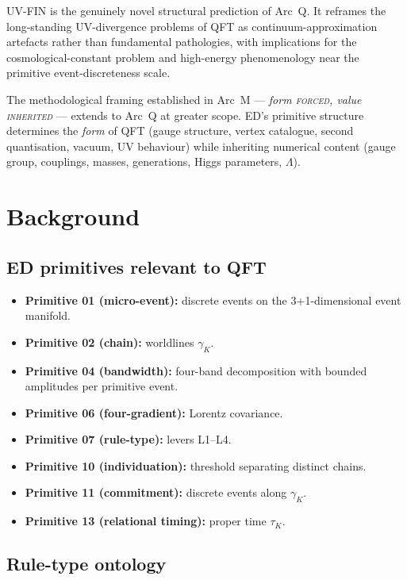 \documentclass[11pt,a4paper]{article}
\begin{document}
UV-FIN is the genuinely novel structural prediction of Arc~Q. It reframes the long-standing UV-divergence problems of QFT as continuum-approximation artefacts rather than fundamental pathologies, with implications for the cosmological-constant problem and high-energy phenomenology near the primitive event-discreteness scale.

The methodological framing established in Arc~M --- \emph{form \textsc{forced}, value \textsc{inherited}} --- extends to Arc~Q at greater scope. ED's primitive structure determines the \emph{form} of QFT (gauge structure, vertex catalogue, second quantisation, vacuum, UV behaviour) while inheriting numerical content (gauge group, couplings, masses, generations, Higgs parameters, $\Lambda$).

\section{Background}

\subsection{ED primitives relevant to QFT}

\begin{itemize}
  \item \textbf{Primitive 01 (micro-event):} discrete events on the 3+1-dimensional event manifold.
  \item \textbf{Primitive 02 (chain):} worldlines $\gamma_K$.
  \item \textbf{Primitive 04 (bandwidth):} four-band decomposition with bounded amplitudes per primitive event.
  \item \textbf{Primitive 06 (four-gradient):} Lorentz covariance.
  \item \textbf{Primitive 07 (rule-type):} levers L1--L4.
  \item \textbf{Primitive 10 (individuation):} threshold separating distinct chains.
  \item \textbf{Primitive 11 (commitment):} discrete events along $\gamma_K$.
  \item \textbf{Primitive 13 (relational timing):} proper time $\tau_K$.
\end{itemize}

\subsection{Rule-type ontology}
\end{document}
